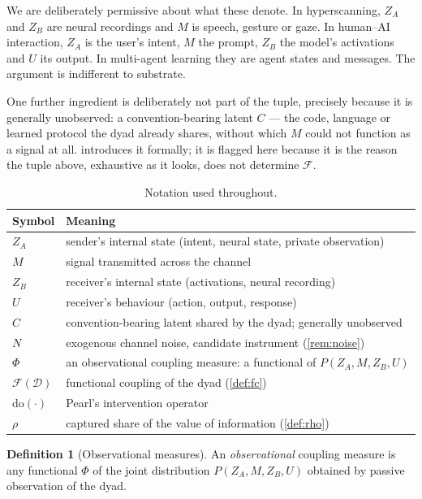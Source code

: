 \documentclass[11pt,a4paper]{article}
\theoremstyle{plain}
\theoremstyle{definition}
\newtheorem{definition}[definition]{Definition}
\theoremstyle{remark}
\newcommand{\Fc}{\mathcal{F}}
\newcommand{\Dy}{\mathcal{D}}
\newcommand{\dop}{\mathrm{do}}
\begin{document}
We are deliberately permissive about what these denote. In hyperscanning, $Z_A$ and $Z_B$ are
neural recordings and $M$ is speech, gesture or gaze. In human--AI interaction, $Z_A$ is the
user's intent, $M$ the prompt, $Z_B$ the model's activations and $U$ its output. In
multi-agent learning they are agent states and messages. The argument is indifferent to
substrate.

One further ingredient is deliberately not part of the tuple, precisely because it is
generally unobserved: a convention-bearing latent $C$ --- the code, language or learned
protocol the dyad already shares, without which $M$ could not function as a signal at all.
 introduces it formally; it is flagged here because it is the reason the
tuple above, exhaustive as it looks, does not determine $\Fc$.

\begin{table}[t]
\centering
\small
\begin{tabular}{@{}ll@{}}
\toprule
\textbf{Symbol} & \textbf{Meaning} \\
\midrule
$Z_A$ & sender's internal state (intent, neural state, private observation) \\
$M$   & signal transmitted across the channel \\
$Z_B$ & receiver's internal state (activations, neural recording) \\
$U$   & receiver's behaviour (action, output, response) \\
$C$   & convention-bearing latent shared by the dyad; generally unobserved \\
$N$   & exogenous channel noise, candidate instrument (\cref{rem:noise}) \\
$\Phi$ & an observational coupling measure: a functional of $P(Z_A,M,Z_B,U)$ \\
$\Fc(\Dy)$ & functional coupling of the dyad (\cref{def:fc}) \\
$\dop(\cdot)$ & Pearl's intervention operator \\
$\rho$ & captured share of the value of information (\cref{def:rho}) \\
\bottomrule
\end{tabular}
\caption{Notation used throughout.}
\label{tab:notation}
\end{table}

\begin{definition}[Observational measures]\label{def:obs}
An \emph{observational} coupling measure is any functional $\Phi$ of the joint distribution
$P(Z_A, M, Z_B, U)$ obtained by passive observation of the dyad.
\end{definition}
\end{document}
